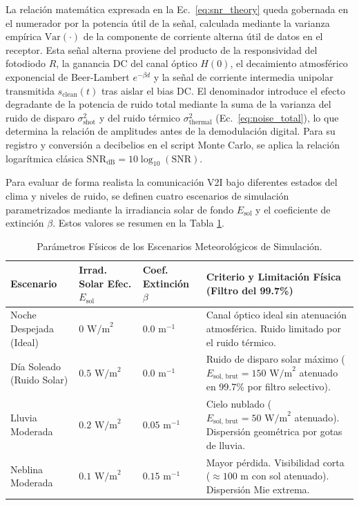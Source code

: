 La relación matemática expresada en la Ec.~\ref{eq:snr_theory} queda gobernada en el numerador por la potencia útil de la señal, calculada mediante la varianza empírica $\text{Var}(\cdot)$ de la componente de corriente alterna útil de datos en el receptor. Esta señal alterna proviene del producto de la responsividad del fotodiodo $R$, la ganancia DC del canal óptico $H(0)$, el decaimiento atmosférico exponencial de Beer-Lambert $e^{-\beta d}$ y la señal de corriente intermedia unipolar transmitida $s_{\text{clean}}(t)$ tras aislar el bias DC. El denominador introduce el efecto degradante de la potencia de ruido total mediante la suma de la varianza del ruido de disparo $\sigma^2_{\text{shot}}$ y del ruido térmico $\sigma^2_{\text{thermal}}$ (Ec.~\ref{eq:noise_total}), lo que determina la relación de amplitudes antes de la demodulación digital. Para su registro y conversión a decibelios en el script Monte Carlo, se aplica la relación logarítmica clásica $\text{SNR}_{\text{dB}} = 10 \log_{10}(\text{SNR})$.



Para evaluar de forma realista la comunicación V2I bajo diferentes estados del clima y niveles de ruido, se definen cuatro escenarios de simulación parametrizados mediante la irradiancia solar de fondo $E_{\text{sol}}$ y el coeficiente de extinción $\beta$. Estos valores se resumen en la Tabla \ref{tab:escenarios_clima}.

\begin{table}[htbp]
	\centering
	\caption{Parámetros Físicos de los Escenarios Meteorológicos de Simulación.}
	\label{tab:escenarios_clima}
	\begin{tabular}{|p{3cm}|p{2.2cm}|p{2.2cm}|p{7.1cm}|}
		\hline
		\textbf{Escenario} & \textbf{Irrad. Solar Efec.} $E_{\text{sol}}$ & \textbf{Coef. Extinción} $\beta$ & \textbf{Criterio y Limitación Física (Filtro del 99.7\%)} \\ \hline
		Noche Despejada (Ideal) & $0\text{ W/m}^2$ & $0.0\text{ m}^{-1}$ & Canal óptico ideal sin atenuación atmosférica. Ruido limitado por el ruido térmico.\\ \hline
		Día Soleado (Ruido Solar) & $0.5\text{ W/m}^2$ & $0.0\text{ m}^{-1}$ & Ruido de disparo solar máximo ($E_{\text{sol, brut}} = 150\text{ W/m}^2$ atenuado en 99.7\% por filtro selectivo).\\ \hline
		Lluvia Moderada & $0.2\text{ W/m}^2$ & $0.05\text{ m}^{-1}$ & Cielo nublado ($E_{\text{sol, brut}} = 50\text{ W/m}^2$ atenuado). Dispersión geométrica por gotas de lluvia.\\ \hline
		Neblina Moderada & $0.1\text{ W/m}^2$ & $0.15\text{ m}^{-1}$ & Mayor pérdida. Visibilidad corta ($\approx 100\text{ m}$ con sol atenuado). Dispersión Mie extrema.\\ \hline
	\end{tabular}
\end{table}

